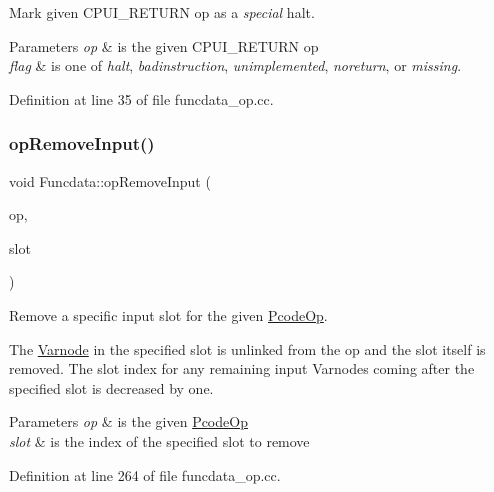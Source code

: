 Mark given C\+P\+U\+I\+\_\+\+R\+E\+T\+U\+RN op as a {\itshape special} halt. 


\begin{DoxyParams}{Parameters}
{\em op} & is the given C\+P\+U\+I\+\_\+\+R\+E\+T\+U\+RN op \\
\hline
{\em flag} & is one of {\itshape halt}, {\itshape badinstruction}, {\itshape unimplemented}, {\itshape noreturn}, or {\itshape missing}. \\
\hline
\end{DoxyParams}


Definition at line 35 of file funcdata\+\_\+op.\+cc.

\mbox{\label{class_funcdata_a84937c2241ea5679280223cc0ec8b202}} 
\subsubsection{\texorpdfstring{opRemoveInput()}{opRemoveInput()}}
{\footnotesize\ttfamily void Funcdata\+::op\+Remove\+Input (\begin{DoxyParamCaption}\item[{\mbox{\hyperlink{class_pcode_op}{Pcode\+Op}} $\ast$}]{op,  }\item[{int4}]{slot }\end{DoxyParamCaption})}



Remove a specific input slot for the given \mbox{\hyperlink{class_pcode_op}{Pcode\+Op}}. 

The \mbox{\hyperlink{class_varnode}{Varnode}} in the specified slot is unlinked from the op and the slot itself is removed. The slot index for any remaining input Varnodes coming after the specified slot is decreased by one. 
\begin{DoxyParams}{Parameters}
{\em op} & is the given \mbox{\hyperlink{class_pcode_op}{Pcode\+Op}} \\
\hline
{\em slot} & is the index of the specified slot to remove \\
\hline
\end{DoxyParams}


Definition at line 264 of file funcdata\+\_\+op.\+cc.


